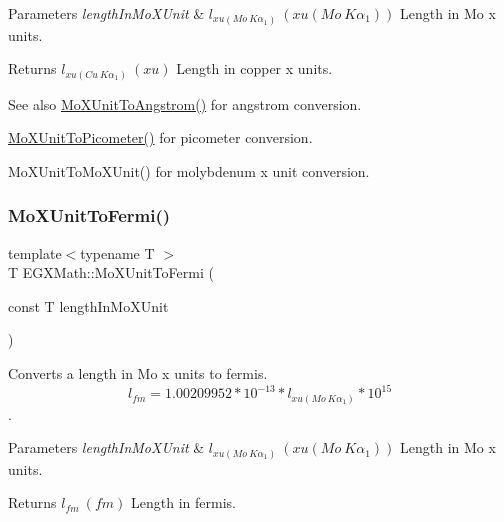 \begin{DoxyParams}{Parameters}
{\em length\+In\+Mo\+X\+Unit} & $ l_{xu(Mo\ K\alpha_1)}\ (xu(Mo\ K\alpha_1))$ Length in Mo x units. \\
\hline
\end{DoxyParams}
\begin{DoxyReturn}{Returns}
$ l_{xu(Cu\ K\alpha_1)}\ (xu)$ Length in copper x units. 
\end{DoxyReturn}
\begin{DoxySeeAlso}{See also}
\mbox{\hyperlink{group___e_g_x_math-_conversions-_length_conversions-_non-_s_i-_mo_x_unit-_non-_s_i_ga1846652500863bdef905f209f3c5e0ae}{Mo\+X\+Unit\+To\+Angstrom()}} for angstrom conversion. 

\mbox{\hyperlink{group___e_g_x_math-_conversions-_length_conversions-_non-_s_i-_mo_x_unit-_s_i_ga9b06995f2d8ddd611999e65539f0896c}{Mo\+X\+Unit\+To\+Picometer()}} for picometer conversion. 

Mo\+X\+Unit\+To\+Mo\+X\+Unit() for molybdenum x unit conversion. 
\end{DoxySeeAlso}
\mbox{\label{group___e_g_x_math-_conversions-_length_conversions-_non-_s_i-_mo_x_unit-_non-_s_i_gac8cb731cb2dd7df67818cade6f80c011}} 
\subsubsection{\texorpdfstring{Mo\+X\+Unit\+To\+Fermi()}{MoXUnitToFermi()}}
{\footnotesize\ttfamily template$<$typename T $>$ \\
T E\+G\+X\+Math\+::\+Mo\+X\+Unit\+To\+Fermi (\begin{DoxyParamCaption}\item[{const T}]{length\+In\+Mo\+X\+Unit }\end{DoxyParamCaption})}



Converts a length in Mo x units to fermis. \[ l_{fm}=1.00209952*10^{-13} * l_{xu(Mo\ K\alpha_1)} * 10^{15} \]. 


\begin{DoxyParams}{Parameters}
{\em length\+In\+Mo\+X\+Unit} & $ l_{xu(Mo\ K\alpha_1)}\ (xu(Mo\ K\alpha_1))$ Length in Mo x units. \\
\hline
\end{DoxyParams}
\begin{DoxyReturn}{Returns}
$ l_{fm}\ (fm)$ Length in fermis. 
\end{DoxyReturn}
\mbox{\label{group___e_g_x_math-_conversions-_length_conversions-_non-_s_i-_mo_x_unit-_non-_s_i_ga8fa37a1f86f7b01d2ca395fb7d2b75ce}} 
